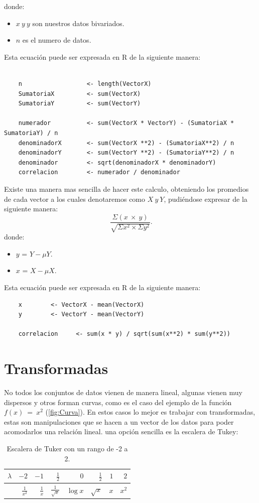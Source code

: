 \documentclass[]{article}
\begin{document}
donde:
\begin{itemize}
	\item $x\ y\ y$ son nuestros datos bivariados.
	\item $n$ es el numero de datos.
\end{itemize}
Esta ecuación puede ser expresada en R de la siguiente manera:
  \begin{lstlisting}

    n                  <- length(VectorX)
    SumatoriaX         <- sum(VectorX)
    SumatoriaY         <- sum(VectorY)
    
    numerador          <- sum(VectorX * VectorY) - (SumatoriaX * SumatoriaY) / n
    denominadorX       <- sum(VectorX **2) - (SumatoriaX**2) / n
    denominadorY       <- sum(VectorY **2) - (SumatoriaY**2) / n
    denominador        <- sqrt(denominadorX * denominadorY)
    correlacion        <- numerador / denominador
   \end{lstlisting}
Existe una manera mas sencilla de hacer este calculo, obteniendo los promedios de cada vector  a los cuales denotaremos como $X\ y\ Y$, pudiéndose expresar de la siguiente manera:
\[\ \frac{\Sigma\left(x\ \times\ y\right)}{\sqrt{\Sigma x^2\times\Sigma y^2}}.\]
donde:
\begin{itemize}
	\item $y$ = $Y - \mu Y$.
	\item $x$ = $X - \mu X$.

\end{itemize}
Esta ecuación puede ser expresada en R de la siguiente manera:
  \begin{lstlisting}
    x        <- VectorX - mean(VectorX)
    y        <- VectorY - mean(VectorY)
    
    correlacion     <- sum(x * y) / sqrt(sum(x**2) * sum(y**2))
   \end{lstlisting}

\section{Transformadas}
No todos los conjuntos de datos vienen de manera lineal, algunas vienen muy dispersos y otros forman curvas, como es el caso del ejemplo de la función $f\left(x\right)\ =\ x^2$ (\autoref{fig:Curva}). 
En estos casos lo mejor es trabajar con transformadas, estas son manipulaciones que se hacen a un vector de los datos para poder acomodarlos una relación lineal. 
una opción sencilla es la escalera de Tukey:

\begin{table}[hbt!]
\begin{center}
 \begin{tabular}{c|r|r|r|r|r|r|r}
    $\lambda$ & $-2$ & $-1$ & $\frac{1}{2}$ & $0$ & $\frac{1}{2}$ & $1$ & $2$\\
   \hline
    & $\frac{1}{x^2}$ & $\frac{1}{x}$ & $\frac{1}{\sqrt{x}}$ & $\log x$ & $\sqrt{x}$ & $x$ & $x^2$ \\
   \hline
 \end{tabular}
 \caption{Escalera de Tuker con un rango de -2 a 2.}
\label{t1}
\end{center}
\end{table}
\end{document}
